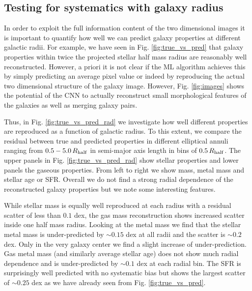 \documentclass[useAMS,usenatbib]{mnras}
\begin{document}
\subsection{Testing for systematics with galaxy radius}
\label{sec:radial}

In order to exploit the full information content of the two dimensional images it is important to quantify how well we can predict galaxy properties at different galactic radii. For example, we have seen in Fig. \ref{fig:true_vs_pred} that galaxy properties within twice the projected stellar half mass radius are reasonably well reconstructed. However, a priori it is not clear if the ML algorithm achieves this by simply predicting an average pixel value or indeed by reproducing the actual two dimensional structure of the galaxy image. However, Fig. \ref{fig:images} shows the potential of the CNN to actually reconstruct small morphological features of the galaxies as well as merging galaxy pairs. 

Thus, in Fig. \ref{fig:true_vs_pred_rad} we investigate how well different properties are reproduced as a function of galactic radius. To this extent, we compare the residual between true and predicted properties in different elliptical annuli ranging from $0.5-5.0\, R_{\rm half}$ in semi-major axis length in bins of $0.5\, R_{\rm half}$. The upper panels in Fig. \ref{fig:true_vs_pred_rad} show stellar properties and lower panels the gaseous properties. From left to right we show mass, metal mass and stellar age or SFR. Overall we do not find a strong radial dependence of the reconstructed galaxy properties but we note some interesting features.

While stellar mass is equally well reproduced at each radius with a residual scatter of less than $0.1$ dex, the gas mass reconstruction shows increased scatter inside one half mass radius. Looking at the metal mass we find that the stellar metal mass is under-predicted by $\sim0.15$ dex at all radii and the scatter is $\sim0.2$ dex. Only in the very galaxy center we find a slight increase of under-prediction. Gas metal mass (and similarly average stellar age) does not show much radial dependence and is under-predicted by $\sim0.1$ dex at each radial bin.  
The SFR is surprisingly well predicted with no systematic bias but shows the largest scatter of $\sim0.25$ dex as we have already seen from Fig. \ref{fig:true_vs_pred}.


\end{document}
